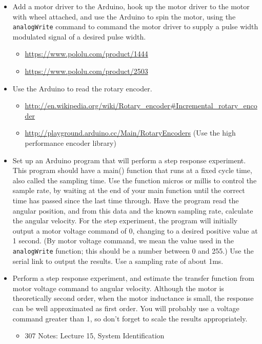 \begin{itemize}
\item Add a motor driver to the Arduino, hook up the motor driver to the motor with wheel attached, and use the Arduino to spin the motor, using the \texttt{analogWrite} command to command the motor driver to supply a pulse width modulated signal of a desired pulse width.  
\begin{itemize}
\item \url{https://www.pololu.com/product/1444}
\item \url{https://www.pololu.com/product/2503}
\end{itemize}
\item Use the Arduino to read the rotary encoder.
\begin{itemize}
\item \url{http://en.wikipedia.org/wiki/Rotary_encoder#Incremental_rotary_encoder}
\item \url{http://playground.arduino.cc/Main/RotaryEncoders} (Use the high performance encoder library)
\end{itemize}
\item Set up an Arduino program that will perform a step response experiment. This program should have a main() function that runs at a fixed cycle time, also called the sampling time. Use the function \textsf{micros} or \textsf{millis} to control the sample rate, by waiting at the end of your main function until the correct time has passed since the last time through. Have the program read the angular position, and from this data and the known sampling rate, calculate the angular velocity. For the step experiment, the program will initially output a motor voltage command of 0, changing to a desired positive value at 1 second. (By motor voltage command, we mean the value used in the \texttt{analogWrite} function; this should be a number between 0 and 255.) Use the serial link to output the results. Use a sampling rate of about 1ms.
\item Perform a step response experiment, and estimate the transfer function from motor voltage command to angular velocity. Although the motor is theoretically second order, when the motor inductance is small, the response can be well approximated as first order. You will probably use a voltage command greater than 1, so don't forget to scale the results appropriately. 

\begin{itemize}
\item 307 Notes: Lecture 15, System Identification
\end{itemize}


\end{itemize}
